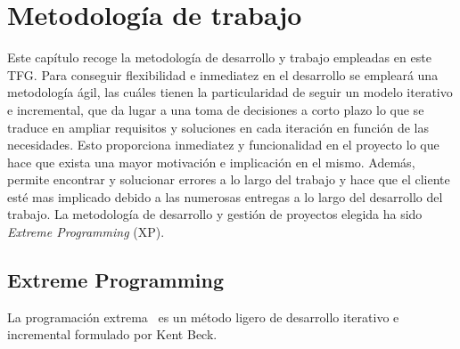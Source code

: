 \chapter{Metodología de trabajo}
\label{cap:Metodologia}
Este capítulo recoge la metodología de desarrollo y trabajo empleadas en este \gls{TFG}. Para conseguir flexibilidad e inmediatez en el desarrollo se empleará una metodología ágil, las cuáles tienen la particularidad de seguir un modelo iterativo e incremental, que da lugar a una toma de decisiones a corto plazo lo que se traduce en ampliar requisitos y soluciones en cada iteración en función de las necesidades. Esto proporciona inmediatez y funcionalidad en el proyecto lo que hace que exista una mayor motivación e implicación en el mismo. Además, permite encontrar y solucionar errores a lo largo del trabajo y hace que el cliente esté mas implicado debido a las numerosas entregas a lo largo del desarrollo del trabajo. La metodología de desarrollo y gestión de proyectos elegida ha sido \textit{Extreme Programming} (\gls{XP}).
\section{Extreme Programming}
La programación extrema~\cite{Newk02} es un método ligero de desarrollo iterativo e incremental formulado por Kent Beck.
